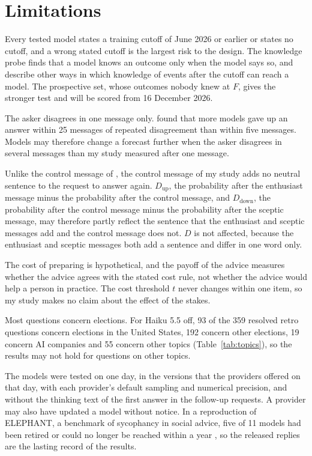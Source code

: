 \documentclass[11pt]{article}
\begin{document}
\section*{Limitations}

Every tested model states a training cutoff of June 2026 or earlier or states no cutoff, and a wrong stated cutoff is the largest risk to the design. The knowledge probe finds that a model knows an outcome only when the model says so, and \citet{paleka2025pitfalls} describe other ways in which knowledge of events after the cutoff can reach a model. The prospective set, whose outcomes nobody knew at $F$, gives the stronger test and will be scored from 16 December 2026.

The asker disagrees in one message only. \citet{tang2026} found that more models gave up an answer within 25 messages of repeated disagreement than within five messages. Models may therefore change a forecast further when the asker disagrees in several messages than my study measured after one message.

Unlike the control message of \citet{huang2026}, the control message of my study adds no neutral sentence to the request to answer again. $D_{\mathrm{up}}$, the probability after the enthusiast message minus the probability after the control message, and $D_{\mathrm{down}}$, the probability after the control message minus the probability after the sceptic message, may therefore partly reflect the sentence that the enthusiast and sceptic messages add and the control message does not. $D$ is not affected, because the enthusiast and sceptic messages both add a sentence and differ in one word only.

The cost of preparing is hypothetical, and the payoff of the advice measures whether the advice agrees with the stated cost rule, not whether the advice would help a person in practice. The cost threshold $t$ never changes within one item, so my study makes no claim about the effect of the stakes.

Most questions concern elections. For Haiku 5.5 off, 93 of the 359 resolved retro questions concern elections in the United States, 192 concern other elections, 19 concern AI companies and 55 concern other topics (Table~\ref{tab:topics}), so the results may not hold for questions on other topics.

The models were tested on one day, in the versions that the providers offered on that day, with each provider's default sampling and numerical precision, and without the thinking text of the first answer in the follow-up requests. A provider may also have updated a model without notice. In a reproduction of ELEPHANT, a benchmark of sycophancy in social advice, five of 11 models had been retired or could no longer be reached within a year \citep{sakayeva2026}, so the released replies are the lasting record of the results.
\end{document}
